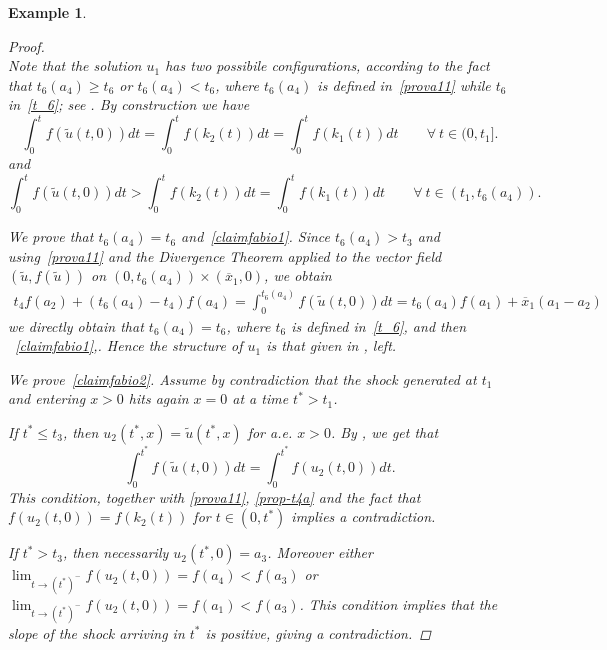 \documentclass[a4paper, 10pt, final]{article}
\newtheorem{example}{Example}[section]
\begin{document}
\begin{example}
\begin{proof}
\begin{equation}
  \end{equation} 
  Note that the solution $u_1$ has two possibile configurations, according to the fact that
  $t_6(a_4) \ge t_6$ or $t_6(a_4) < t_6$, 
  where $t_6(a_4)$ is defined in~\eqref{prova11} while $t_6$ in~\eqref{t_6}; 
  see . 
  By construction we have
  \begin{equation}
  \label{prop-t4a}
      \int_0^{t}
    f(\widetilde u(t,0))dt = 
    \int_0^{t}
    f(k_2(t))dt=
    \int_0^{t}
    f(k_1(t))dt
    \qquad \forall~t\in (0,t_1].
  \end{equation}
  and
  \begin{equation}
  \label{prop-t4ab}
      \int_0^{t}
    f(\widetilde u(t,0))dt > 
    \int_0^{t}
    f(k_2(t))dt=
    \int_0^{t}
    f(k_1(t))dt
    \qquad \forall~t\in (t_1,t_6(a_4)).
  \end{equation}

  
  We prove that $t_6(a_4) = t_6$ and~\eqref{claimfabio1}. Since $t_6(a_4) > t_3$ and using~\eqref{prova11} and the Divergence Theorem applied to the vector
  field $(\widetilde u, f(\widetilde u))$ on $(0, t_6(a_4)) \times (\overline x_1, 0)$, we 
  obtain
  \begin{align*}
    t_4 f(a_2) + (t_6(a_4) - t_4) f(a_4)
     = \int_{0}^{t_6(a_4)} f(\widetilde{u}(t, 0)) dt
    = t_6(a_4) f(a_1) + \overline{x}_1 (a_1 - a_2) 
  \end{align*}
  we directly obtain that $t_6(a_4) = t_6$,   
where $t_6$ is defined in~\eqref{t_6}, and then ~\eqref{claimfabio1},.
  Hence the structure of $u_1$ is that given in , left.
  

  We prove~\eqref{claimfabio2}.  
  Assume by contradiction that the shock generated at $t_1$ and entering $x>0$ hits again $x=0$ at a time $t^*>t_1$. 
  
If $t^* \le t_3$, then $u_2(t^*, x) = \widetilde u(t^*, x)$ for a.e. $x>0$.
  By , we get that
  \[
    \int_{0}^{t^*}f(\widetilde u( t,0))dt = \int_{0}^{t^*}f( u_2( t,0))dt.
  \] 
  This condition, together with  \eqref{prova11}, \eqref{prop-t4a} and the fact that $f(u_2(t,0)) = f(k_2(t))$ 
  for $t\in (0, t^*)$ implies a contradiction.

  If $t^* > t_3$, then necessarily $u_2(t^*, 0)= a_3$. Moreover
  either $\lim_{t\to (t^*)^-} f(u_2(t, 0))=f(a_4)<f(a_3)$ or $\lim_{t\to (t^*)^-} f(u_2(t, 0))=f(a_1)<f(a_3)$.
  This condition implies that  the slope of the shock arriving in $t^*$ is positive, giving a contradiction.
  

\end{proof}
\end{example}
\end{document}
